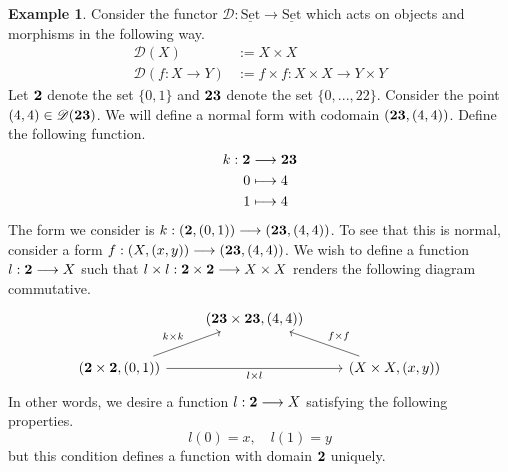 \documentclass[12pt]{article}
\theoremstyle{plain}
\theoremstyle{definition}
\newtheorem{example}[thm]{Example}
\newcommand{\scr}[1]{\mathscr{#1}}
\newcommand{\lto}{\longrightarrow}
\newcommand{\set}{\operatorname{\underline{Set}}}
\begin{document}
	\begin{example}\label{ex:saturated_normal_form}
		Consider the functor $\scr{D}: \set \lto \set$ which acts on objects and morphisms in the following way.
		\begin{align*}
			\scr{D}(X) &:= X \times X\\
			\scr{D}(f: X \lto Y) &:= f \times f: X \times X \lto Y \times Y
			\end{align*}
		Let $\bold{2}$ denote the set $\lbrace 0, 1 \rbrace$ and $\bold{23}$ denote the set $\lbrace 0, ..., 22\rbrace$. Consider the point $(4,4) \in \scr{D}(\bold{23})$. We will define a normal form with codomain $(\bold{23}, (4,4))$. Define the following function.
		\begin{align}
			k: \bold{2} &\lto \bold{23}\\
			0 &\longmapsto 4\\
			1 &\longmapsto 4
		\end{align}
		The form we consider is $k: (\bold{2},(0,1)) \lto (\bold{23}, (4,4))$. To see that this is normal, consider a form $f: (X, (x,y)) \lto (\bold{23}, (4,4))$. We wish to define a function $l: \bold{2} \lto X$ such that $l \times l: \bold{2} \times \bold{2} \lto X \times X$ renders the following diagram commutative.
		\begin{equation}
			\begin{tikzcd}
				& (\bold{23} \times \bold{23}, (4,4))\\
				(\bold{2} \times \bold{2}, (0,1))\arrow[ur,"{k \times k}"]\arrow[rr,swap,"{l \times l}"] && (X \times X, (x,y))\arrow[ul,swap,"{f \times f}"]
			\end{tikzcd}
		\end{equation}
		In other words, we desire a function $l: \bold{2} \lto X$ satisfying the following properties.
		\begin{equation}
			l(0) = x, \quad l(1) = y
		\end{equation}
		but this condition defines a function with domain $\bold{2}$ uniquely.
		\end{example}
	
\end{document}
